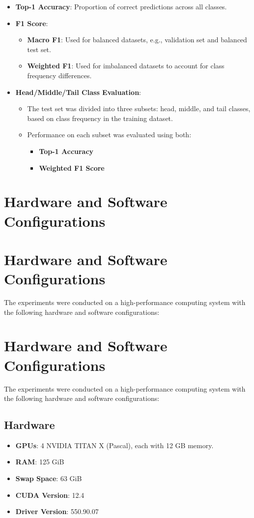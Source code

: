 \begin{itemize}
    \item \textbf{Top-1 Accuracy}: Proportion of correct predictions across all classes.
    \item \textbf{F1 Score}:
    \begin{itemize}
        \item \textbf{Macro F1}: Used for balanced datasets, e.g., validation set and balanced test set.
        \item \textbf{Weighted F1}: Used for imbalanced datasets to account for class frequency differences.
    \end{itemize}
    \item \textbf{Head/Middle/Tail Class Evaluation}: 
    \begin{itemize}
        \item The test set was divided into three subsets: head, middle, and tail classes, based on class frequency in the training dataset.
        \item Performance on each subset was evaluated using both:
        \begin{itemize}
            \item \textbf{Top-1 Accuracy}
            \item \textbf{Weighted F1 Score}
        \end{itemize}
    \end{itemize}
\end{itemize}


\section{Hardware and Software Configurations}
\section{Hardware and Software Configurations}

The experiments were conducted on a high-performance computing system with the following hardware and software configurations:

\section{Hardware and Software Configurations}

The experiments were conducted on a high-performance computing system with the following hardware and software configurations:

\subsection{Hardware}
\begin{itemize}
    \item \textbf{GPUs}: 4 NVIDIA TITAN X (Pascal), each with 12 GB memory.
    \item \textbf{RAM}: 125 GiB
    \item \textbf{Swap Space}: 63 GiB
    \item \textbf{CUDA Version}: 12.4
    \item \textbf{Driver Version}: 550.90.07
\end{itemize}

